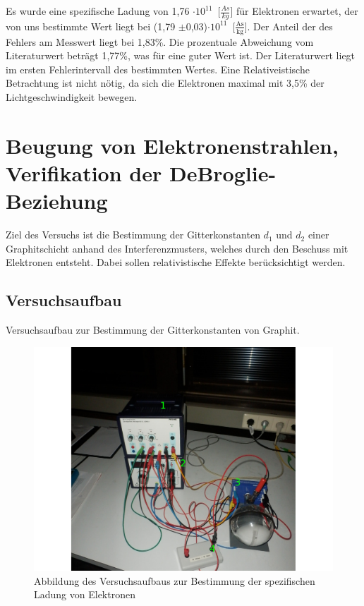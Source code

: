 \documentclass[12pt,a4paper]{article}
\begin{document}
Es wurde eine spezifische Ladung von \unit{1,76 $\cdot 10^{11}$}[$\frac{As}{kg}$] für Elektronen erwartet, der von uns bestimmte Wert liegt bei \unit{(1,79 $\pm$0,03)$\cdot 10^{11}$}[$\frac{\text{As}}{\text{kg}}$]. Der Anteil der des Fehlers am Messwert liegt bei 1,83\%. Die prozentuale Abweichung vom Literaturwert beträgt 1,77\%, was für eine guter Wert ist. Der Literaturwert liegt im ersten Fehlerintervall des bestimmten Wertes. Eine Relativeistische Betrachtung ist nicht nötig, da sich die Elektronen maximal mit 3,5\% der Lichtgeschwindigkeit bewegen.

\section{Beugung von Elektronenstrahlen, Verifikation der DeBroglie-Beziehung}
Ziel des Versuchs ist die Bestimmung der Gitterkonstanten $d_1$ und $d_2$ einer Graphitschicht anhand des Interferenzmusters, welches durch den Beschuss mit Elektronen entsteht. Dabei sollen relativistische Effekte berücksichtigt werden.
\subsection{Versuchsaufbau}

Versuchsaufbau zur Bestimmung der Gitterkonstanten von Graphit.

\begin{figure}[H] 
  \centering
    \includegraphics[scale = 0.3]{aufbau_b.pdf}
  	\caption[Abbildung des Versuchsaufbaus zur Bestimmung der spezifischen Ladung von Elektronen]{Abbildung des Versuchsaufbaus zur Bestimmung der spezifischen Ladung von Elektronen}
  \label{fig:aufbau_h}
\end{figure}
\end{document}

